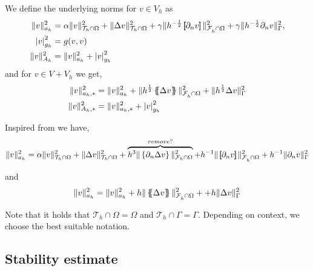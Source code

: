 We define the underlying norms for $ v \in V_{h} $ as
    \begin{align}
        \label{eq:bi_ah_norm}
        \| v \|_{ a_{h} }^{ 2 } & =    \alpha  \|   v \|_{ \mathcal{T} _{h} \cap \Omega  }^{ 2}  + \|  \Delta v \|_{\mathcal{T} _{h} \cap \Omega   }^{ 2 } + \gamma \| h^{-\frac{1}{2}} \left[\!\!\left[  \partial _{n} v  \right]\!\!\right]   \|_{ \mathcal{F}_{h}^{}\cap \Omega    }^{ 2
        } + \gamma \| h^{-\frac{1}{2}}  \partial _{n} v    \|_{ \Gamma   }^{ 2 },    \\
        \label{eq:bi_gh_norm}
\left\lvert  v  \right\rvert _{g_{h}}^{2} & = g( v,v) \\
        \label{eq:bi_Ah_norm}
\| v \|_{A_{h}  }^{  2}  & = \| v \|_{ a_{h} }^{ 2 } + \left\lvert  v  \right\rvert _{g_{h}}^{2}
    \end{align}
and for $v \in V + V_{h}$ we get, \[
    \begin{split}
\| v \|_{ a_{h}, * }^{  2} & =\| v \|_{ a_{h} }^{ 2 } +  \| h^{\frac{1}{2}} \left\{\!\!\left\{ \Delta  v \right\}\!\!\right\}   \|_{\mathcal{F} _{h}^{} \cap \Omega   }^{  2} +  \| h^{\frac{1}{2}} \Delta  v    \|_{ \Gamma }^{  2}  \\
\| v \|_{A_{h},*  }^{  2}  & = \| v \|_{ a_{h},* }^{ 2 } + \left\lvert  v  \right\rvert _{g_{h}}^{2}
    \end{split}
\]

Inspired from \cite[Equation 3.5]{feng2007fully} we have,
\begin{equation*}
\|v\|_{a_{h}} ^{2}  = \alpha  \|v\|_{ \mathcal{T}_{h} \cap \Omega  }^2 + \|\Delta v\|_{ \mathcal{T}_{h} \cap \Omega  }^2 + \overbrace{h^3   \| \left\{\partial_n \Delta v\right\} \| _{\mathcal{F}_{h} \cap \Omega  }^2 }^{ remove?}
+ h^{-1} \| \left[\!\!\left[  \partial_n v  \right]\!\!\right] \|_{ \mathcal{F}_{h}^{} \cap \Omega   }^{2} + h^{-1} \|  \partial_n v  \|_{ \Gamma    }^{2}
\end{equation*}

and
\begin{equation*}
\|v\|_{a_{h}} ^{2}  = \| v \|_{ a_{h} }^{ 2 } +   h \| \left\{\!\!\left\{ \Delta v \right\}\!\!\right\} \|_{ \mathcal{F}_{h}^{} \cap \Omega     }^{2  } + +   h \| \Delta v  \|_{ \Gamma }^{2  }
\end{equation*}

\begin{remark}
Note that it holds that $\mathcal{T} _{h} \cap  \Omega   = \Omega  $ and $\mathcal{T} _{h} \cap  \Gamma  = \Gamma $. Depending on context, we choose the best suitable notation.
\end{remark}

\subsection{Stability estimate}%
\label{sub:stability_estimate}

